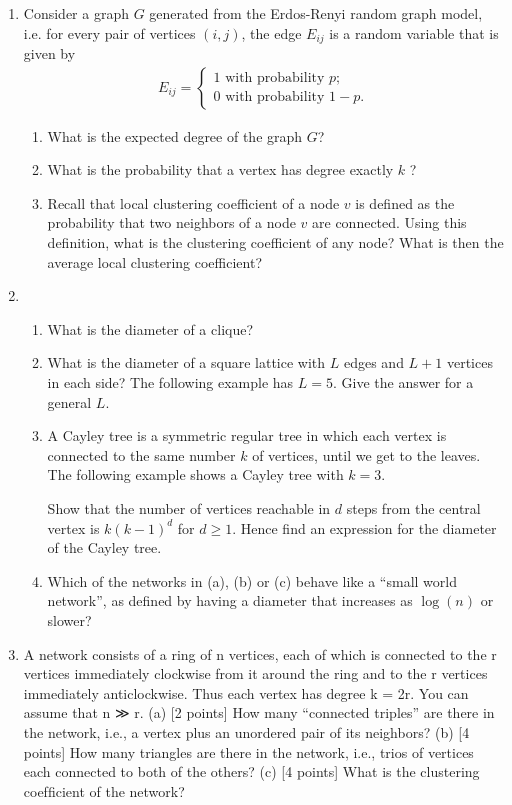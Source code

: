 \documentclass[a4paper,10pt]{article}
\begin{document}
\begin{enumerate}
\item Consider a graph $G$ generated from the Erdos-Renyi random graph model, 
i.e. for every pair of vertices $(i, j)$, the 
edge $E_{ij}$ is a random variable that is given by 
\begin{align*}
  E_{ij} = \begin{cases}
           1 \mbox{ with probability } p;\\
           0 \mbox{ with probability } 1 - p.
            \end{cases}
\end{align*}
\begin{enumerate}
 \item What is the expected degree of the graph $G$?
 \item What is the probability that a vertex has degree exactly $k$ ?
 \item Recall that local clustering coefficient of a node $v$ is defined as the probability that two neighbors of a node $v$ are connected. 
 Using this definition, what is the clustering coefficient of any node? What is then the average local clustering coefficient?
\end{enumerate}





\item 
\begin{enumerate}
\item What is the diameter of a clique?
\item What is the diameter of a square lattice with $L$ edges and $L+1$ vertices in each side? The following example has $L=5$.
Give the answer for a general $L$.
\vspace*{2in}

\item A Cayley tree is a symmetric regular tree in which each vertex is connected to the same number $k$ of vertices, 
until we get to the leaves. The following example shows a Cayley tree with $k = 3$. 
\vspace*{2in}

Show that the number of vertices reachable in $d$ steps from the central vertex is $k(k-1)^d$ for $d \ge 1$. 
Hence find an expression for the diameter of the Cayley tree. 

\item Which of the networks in (a), (b) or (c) behave like a ``small world network'', as defined by having a diameter
that increases as $\log(n)$ or slower?
\end{enumerate}

\item 
 A network consists of a ring of n vertices, each of which is connected to the r vertices immediately
clockwise from it around the ring and to the r vertices immediately anticlockwise. Thus each
vertex has degree k = 2r. You can assume that n ≫ r.
(a) [2 points] How many “connected triples” are there in the network, i.e., a vertex plus an
unordered pair of its neighbors?
(b) [4 points] How many triangles are there in the network, i.e., trios of vertices each connected
to both of the others?
(c) [4 points] What is the clustering coefﬁcient of the network?


\end{enumerate}
\end{document}

